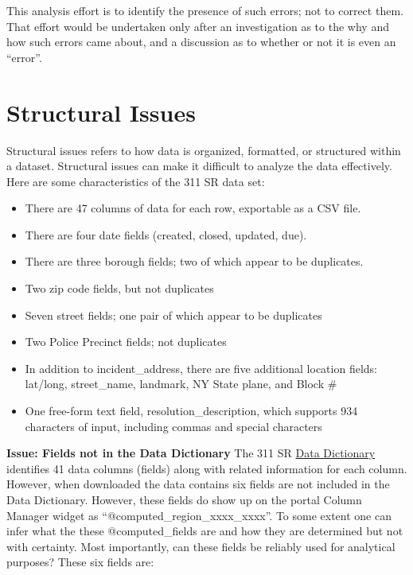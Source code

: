 \documentclass[12pt, titlepage]{article}
\begin{document}
This analysis effort is to identify the presence of such errors; not to correct them. 
That effort would be undertaken only after an investigation as to the why
and how such errors came about, and a discussion as to whether or not it 
is even an ``error''. 



\section{Structural Issues}
\label{sec:structural}
Structural issues refers to how data is organized, formatted, 
or structured within a dataset. Structural issues can make 
it difficult to analyze the data effectively. Here are some 
characteristics of the 311 SR data set:

\begin{itemize}
	\item There are 47 columns of data for each row, exportable as a CSV file.
	\item There are four date fields (created, closed, updated, due).
	\item There are three borough fields; two of which appear to be duplicates.
	\item Two zip code fields, but not duplicates
	\item Seven street fields; one pair of which appear to be duplicates
	\item Two Police Precinct fields; not duplicates
	\item In addition to incident\_address, there are five additional location fields: 
	lat/long, street\_name, landmark, NY State plane, and Block \#
	\item One free-form text field, resolution\_description, which 
	supports 934 characters of input, including commas and special characters
\end{itemize}

\textbf{Issue: Fields not in the Data Dictionary} The 311 SR 
\href{https://data.cityofnewyork.us/api/views/erm2-nwe9/files/b372b884-f86a-453b-ba16-1fe06ce9d212?download=true&filename=311_ServiceRequest_2010-Present_DataDictionary_Updated_2023.xlsx}{Data Dictionary}
 identifies 41 data columns (fields) along with related information 
 for each column. However, when downloaded the data contains 
 six fields are not included in the Data Dictionary. However, these
 fields do show up on the portal Column Manager widget
 as ``@computed\_region\_xxxx\_xxxx''. To some extent one can infer 
 what the these @computed\_fields are and how they are determined but
 not with certainty. Most importantly, can these fields be reliably 
 used for analytical purposes?  These six fields are:
\end{document}
